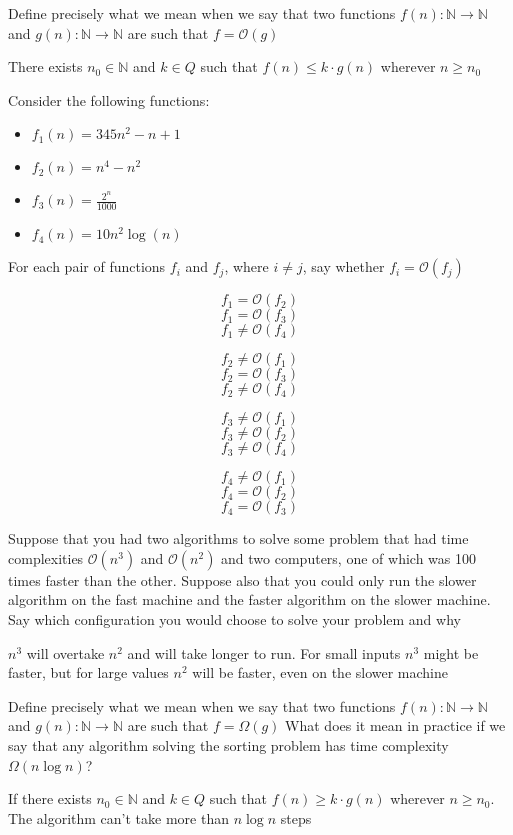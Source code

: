 \documentclass[addpoints]{exam}
\begin{document}
\begin{questions}
\question[2]Define precisely what we mean when we say that two functions $f(n):\mathbb{N}\rightarrow\mathbb{N}$ and $g(n):\mathbb{N}\rightarrow\mathbb{N}$ are such that $f=\mathcal{O}(g)$
\begin{solution}[2in]
	There exists $n_0\in \mathbb{N}$ and $k\in Q$ such that $f(n)\leqslant k\cdot g(n)$ wherever $n\geqslant n_0$
\end{solution}

\question[6]Consider the following functions:
\begin{itemize}
	\item $f_1(n)=345n^2-n+1$
	\item $f_2(n)=n^4-n^2$
	\item $f_3(n)=\frac{2^n}{1000}$
	\item $f_4(n)=10n^2\log(n)$
\end{itemize}
For each pair of functions $f_i$ and $f_j$, where $i\neq j$, say whether $f_i=\mathcal{O}(f_j)$
\begin{solution}[2in]
	$$f_1=\mathcal{O}(f_2)$$
	$$f_1=\mathcal{O}(f_3)$$
	$$f_1\neq \mathcal{O}(f_4)$$
	
	$$f_2\neq \mathcal{O}(f_1)$$
	$$f_2=\mathcal{O}(f_3)$$
	$$f_2\neq\mathcal{O}(f_4)$$
	
	$$f_3\neq\mathcal{O}(f_1)$$
	$$f_3\neq\mathcal{O}(f_2)$$
	$$f_3\neq\mathcal{O}(f_4)$$
	
	$$f_4\neq\mathcal{O}(f_1)$$
	$$f_4=\mathcal{O}(f_2)$$
	$$f_4=\mathcal{O}(f_3)$$
	
\end{solution}


\question[4]Suppose that you had two algorithms to solve some problem that had
time complexities $\mathcal{O}(n^3)$ and $\mathcal{O}(n^2)$ and two computers, one of which
was 100 times faster than the other. Suppose also that you could only
run the slower algorithm on the fast machine and the faster algorithm
on the slower machine. Say which configuration you would choose to
solve your problem and why
\begin{solution}[2in]
	$n^3$ will overtake $n^2$ and will take longer to run. For small inputs $n^3$ might be faster, but for large values $n^2$ will be faster, even on the slower machine
\end{solution}

\question[4]
Define precisely what we mean when we say that two functions $f(n):\mathbb{N}\rightarrow\mathbb{N}$ and $g(n):\mathbb{N}\rightarrow\mathbb{N}$ are such that $f=\Omega(g)$ What does it mean in practice if we say that any algorithm solving the sorting problem has time complexity $\Omega(n\log n)$?
\begin{solution}[2in]
	If there exists $n_0\in \mathbb{N}$ and $k\in Q$ such that $f(n)\geqslant k\cdot g(n)$ wherever $n\geqslant n_0$. The algorithm can't take more than $n\log n$ steps
\end{solution}


\end{questions}
\end{document}
